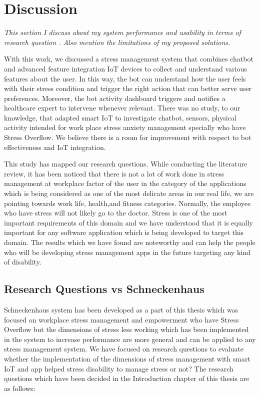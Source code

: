 \chapter{Discussion}
\textit{This section I discuss about my system performance and usability in terms of research question . Also mention the limitations of my proposed solutions.}
\vspace{5mm}

With  this  work,  we discussed  a  stress management  system  that  combines  chatbot  and advanced  feature  integration IoT devices to collect and understand various features about the user. In this way, the  bot  can  understand  how  the  user  feels  with  their stress condition and trigger the right action that can better serve user preferences. Moreover, the bot activity dashboard triggers and notifies a  healthcare  expert to  intervene  whenever relevant.
There  was  no study, to  our  knowledge,  that  adapted  smart \acs{IoT} to investigate chatbot, sensors, physical activity intended for work place stress anxiety management specially who have Stress Overflow. We believe there is  a  room  for  improvement  with  respect to  bot  effectiveness  and  IoT integration.  

This study has mapped our research questions. While conducting the literature review, it has been noticed that there is not a lot of work done in stress management at workplace factor of the user in the category of the applications which is being considered as one of the most delicate areas in our real life, we are pointing towards work life, health,and fitness categories. Normally, the employee who have stress will not likely go to the doctor. Stress is one of the most important requirements of this domain and we have understood that it is equally important for any software application which is being developed to target this domain. The results which we have found are noteworthy and can help the people who will be developing stress management apps in the future targeting any kind of disability. 

\section{Research Questions vs Schneckenhaus}

Schneckenhaus system has been developed as a part of this thesis which was focused on workplace stress management and empowerment who have Stress Overflow but the dimensions of stress less working which has been implemented in the system to increase performance are more general and can be applied to any stress management system. We have focused on research questions to evaluate whether the implementation of the dimensions of stress management with smart IoT and app helped stress disability to manage stress or not? The research questions which have been decided in the Introduction chapter of this thesis are as follows: 

